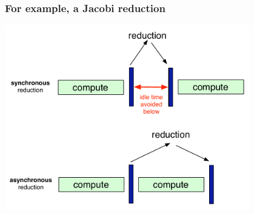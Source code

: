 \begin{frame}
  \frametitle{For example, a Jacobi reduction}
  \begin{center}
    \includegraphics[width=0.8\textwidth]{figures/asyncReduction.pdf}
  \end{center}
\end{frame}

